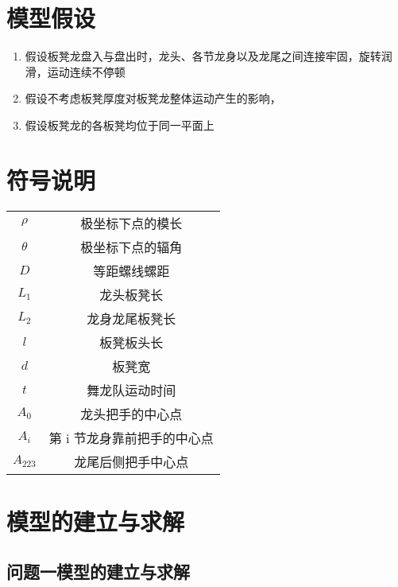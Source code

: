\documentclass[a4paper]{article}
\begin{document}
	\section{模型假设}
	\begin{enumerate} 
		\item 假设板凳龙盘入与盘出时，龙头、各节龙身以及龙尾之间连接牢固，旋转润滑，运动连续不停顿
		\item 假设不考虑板凳厚度对板凳龙整体运动产生的影响，
		\item 假设板凳龙的各板凳均位于同一平面上
	\end{enumerate}
	
	\section{符号说明}
	\begin{table}[H] %
		\captionsetup{skip=4pt} %
		\centering
		\setlength{\arrayrulewidth}{2pt} %
		\begin{tabular}{cc} %
			\hline
			\makebox[0.15\textwidth][c]{符号} & \makebox[0.6\textwidth][c]{说明}  \\ 
			\hline
			$\rho$ & 极坐标下点的模长  \\
			$\theta$ & 极坐标下点的辐角  \\
			$D$ & 等距螺线螺距  \\
			$L_1$ & 龙头板凳长  \\
			$L_2$ & 龙身龙尾板凳长  \\
			$l$ & 板凳板头长 \\
			$d$ & 板凳宽  \\
			$t$ & 舞龙队运动时间  \\
			$A_0$ & 龙头把手的中心点  \\
			$A_i$ & 第 i 节龙身靠前把手的中心点  \\
			$A_{223}$ & 龙尾后侧把手中心点  \\
			\hline
		\end{tabular}
	\end{table}
	
	
	\section{模型的建立与求解}
	\subsection{问题一模型的建立与求解}
\end{document}
